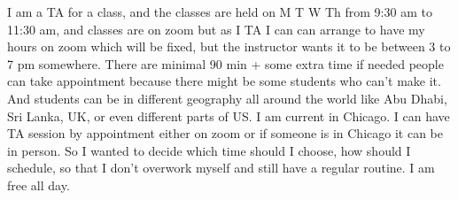\begin{userprompt}

I am a TA for a class, and the classes are held on M T W Th from 9:30 am to 11:30 am, and classes are on zoom but as I TA I can can arrange to have my hours on zoom which will be fixed, but the instructor wants it to be between 3 to 7 pm somewhere. There are minimal 90 min + some extra time if needed people can take appointment because there might be some students who can't make it. And students can be in different geography all around the world like Abu Dhabi, Sri Lanka, UK, or even different parts of US. I am current in Chicago. I can have TA session by appointment either on zoom or if someone is in Chicago it can be in person. So I wanted to decide which time should I choose, how should I schedule, so that I don't overwork myself and still have a regular routine. I am free all day.

\end{userprompt}

